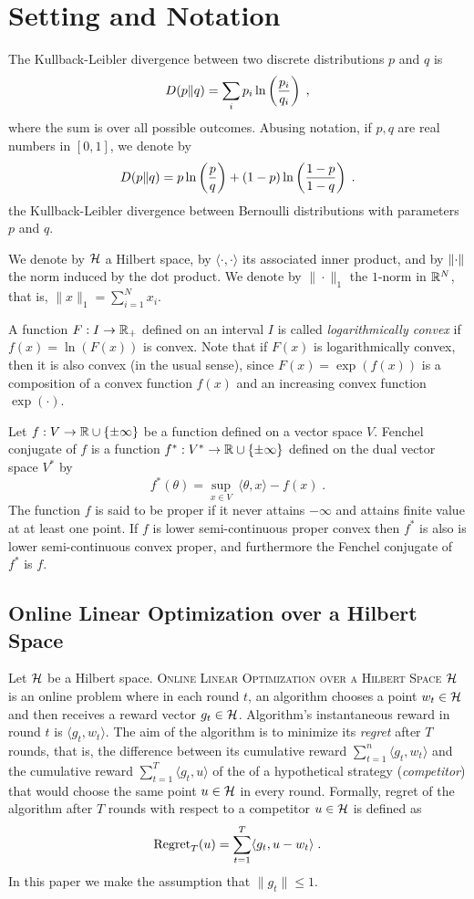 \section{Setting and Notation}

The Kullback-Leibler divergence between two discrete
distributions $p$ and $q$ is
$$
D({p}\|{q}) = \sum_{i} p_i \ln\left( \frac{p_i}{q_i} \right) \; ,
$$
where the sum is over all possible outcomes. Abusing notation, if $p,q$ are real
numbers in $[0,1]$, we denote by
$$
D({p}\|{q}) = p \ln \left(\frac{p}{q} \right) + (1-p) \ln \left(\frac{1-p}{1-q} \right) \; .
$$
the Kullback-Leibler divergence between Bernoulli distributions with parameters
$p$ and $q$.

We denote by $\mathcal{H}$ a Hilbert space, by $\langle \cdot, \cdot\rangle$ its
associated inner product, and by $\left\|{\cdot}\right\|$ the norm induced by the dot
product. We denote by $\|\cdot\|_1$ the $1$-norm in $\mathbb{R}^N$, that is, $\|x\|_1 =
\sum_{i=1}^N x_i$.

A function $F:I \to \mathbb{R}_+$ defined on an interval $I$ is called
\emph{logarithmically convex} if $f(x) = \ln(F(x))$ is convex. Note that if
$F(x)$ is logarithmically convex, then it is also convex (in the usual sense),
since $F(x) = \exp(f(x))$ is a composition of a convex function $f(x)$ and an
increasing convex function $\exp(\cdot)$.

Let $f:V \to \mathbb{R} \cup \{\pm\infty\}$ be a function defined on a vector space $V$.
Fenchel conjugate of $f$ is a function $f^*:V^* \to \mathbb{R} \cup \{\pm \infty\}$
defined on the dual vector space $V^*$ by
$$
f^*(\theta) = \sup_{x \in V} \ \langle \theta, x \rangle - f(x) \; .
$$
The function $f$ is said to be proper if it never attains $-\infty$ and attains
finite value at at least one point. If $f$ is lower semi-continuous proper
convex then $f^*$ is also is lower semi-continuous convex proper, and
furthermore the Fenchel conjugate of $f^*$ is $f$.

\subsection{Online Linear Optimization over a Hilbert Space}

Let $\mathcal{H}$ be a Hilbert space. \textsc{Online Linear Optimization over a Hilbert
Space $\mathcal{H}$} is an online problem where in each round $t$, an algorithm chooses a
point $w_t \in \mathcal{H}$ and then receives a reward vector $g_t \in \mathcal{H}$. Algorithm's
instantaneous reward in round $t$ is $\langle g_t, w_t \rangle$. The aim of the
algorithm is to minimize its \emph{regret} after $T$ rounds, that is, the
difference between its cumulative reward $\sum_{t=1}^n \langle g_t, w_t \rangle$
and the cumulative reward $\sum_{t=1}^T \langle g_t, u \rangle$ of the of a
hypothetical strategy (\emph{competitor}) that would choose the same point $u
\in \mathcal{H}$ in every round. Formally, regret of the algorithm after $T$ rounds with
respect to a competitor $u \in \mathcal{H}$ is defined as
\begin{equation}
\label{equation:regret-definition}
\operatorname{Regret}_T(u) = \sum_{t=1}^T \langle g_t , u - w_t \rangle \; .
\end{equation}
In this paper we make the assumption that $\|g_t\| \le 1$.


